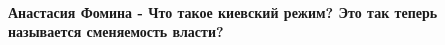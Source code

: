  
 
 
 
 
\paragraph{Анастасия Фомина - Что такое киевский режим? Это так теперь называется сменяемость власти?}
\label{sec:03_10_2021.fb.zaharova_maria.mid_rf.1.zelenskii_politika_naglost.cmt.2.fomina_smenjajemost_vlasti}

